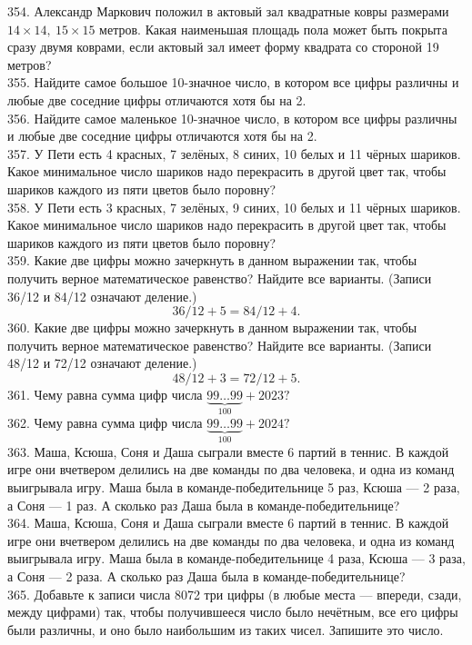 354. Александр Маркович положил в актовый зал квадратные ковры размерами $14 \times 14,\ 15 \times 15$ метров. Какая наименьшая площадь пола может быть покрыта сразу двумя коврами, если актовый зал имеет форму квадрата со стороной 19 метров?\\
355. Найдите самое большое 10-значное число, в котором все цифры различны и любые две соседние цифры отличаются хотя бы на 2.\\
356. Найдите самое маленькое 10-значное число, в котором все цифры различны и любые две соседние цифры отличаются хотя бы на 2.\\
357. У Пети есть 4 красных, 7 зелёных, 8 синих, 10 белых и 11 чёрных шариков. Какое минимальное число шариков надо перекрасить в другой цвет так, чтобы шариков каждого из пяти цветов было поровну?\\
358. У Пети есть 3 красных, 7 зелёных, 9 синих, 10 белых и 11 чёрных шариков. Какое минимальное число шариков надо перекрасить в другой цвет так, чтобы шариков каждого из пяти цветов было поровну?\\
359. Какие две цифры можно зачеркнуть в данном выражении так, чтобы получить верное математическое равенство? Найдите все варианты. (Записи 36/12 и 84/12 означают деление.)
$$ 36/12+5=84/12+4.$$
360. Какие две цифры можно зачеркнуть в данном выражении так, чтобы получить верное математическое равенство? Найдите все варианты. (Записи 48/12 и 72/12 означают деление.)
$$48/12+3=72/12+5.$$
361. Чему равна сумма цифр числа $\underbrace{99\ldots99}_{100}+2023?$\\
362. Чему равна сумма цифр числа $\underbrace{99\ldots99}_{100}+2024?$\\
363. Маша, Ксюша, Соня и Даша сыграли вместе 6 партий в теннис. В каждой игре они вчетвером делились на две команды по два человека, и одна из команд выигрывала игру. Маша была в команде-победительнице 5 раз, Ксюша --- 2 раза, а Соня --- 1 раз. А сколько раз Даша была в команде-победительнице?\\
364. Маша, Ксюша, Соня и Даша сыграли вместе 6 партий в теннис. В каждой игре они вчетвером делились на две команды по два человека, и одна из команд выигрывала игру. Маша была в команде-победительнице 4 раза, Ксюша --- 3 раза, а Соня --- 2 раза. А сколько раз Даша была в команде-победительнице?\\
365. Добавьте к записи числа 8072 три цифры (в любые места --- впереди, сзади, между цифрами) так, чтобы получившееся число было нечётным, все его цифры были различны, и оно было наибольшим из таких чисел. Запишите это число.\\
